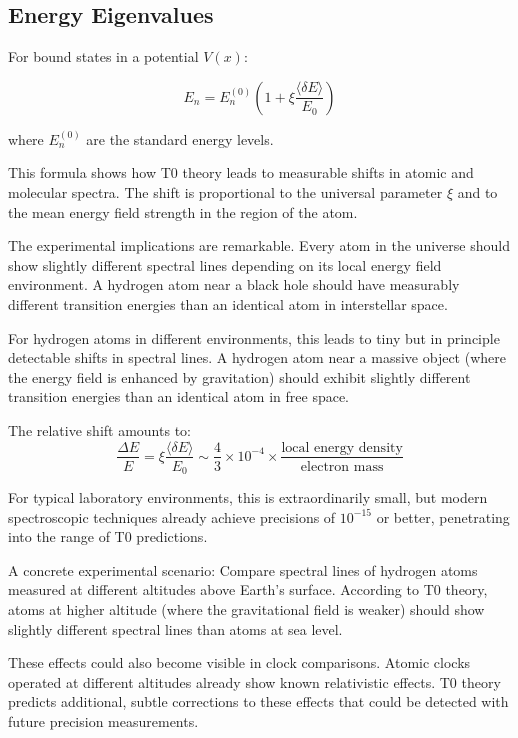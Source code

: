 \documentclass[12pt,a4paper]{article}
\newcommand{\deltaE}{\delta E}
\newcommand{\xipar}{\xi}
\theoremstyle{definition}
\theoremstyle{remark}
\begin{document}
\subsection{Energy Eigenvalues}

For bound states in a potential $V(x)$:

\begin{equation}
	E_n = E_n^{(0)} \left(1 + \xipar \frac{\langle \deltaE \rangle}{E_0}\right)
	\label{eq:energy_shift}
\end{equation}

where $E_n^{(0)}$ are the standard energy levels.

This formula shows how T0 theory leads to measurable shifts in atomic and molecular spectra. The shift is proportional to the universal parameter $\xipar$ and to the mean energy field strength in the region of the atom.

The experimental implications are remarkable. Every atom in the universe should show slightly different spectral lines depending on its local energy field environment. A hydrogen atom near a black hole should have measurably different transition energies than an identical atom in interstellar space.

For hydrogen atoms in different environments, this leads to tiny but in principle detectable shifts in spectral lines. A hydrogen atom near a massive object (where the energy field is enhanced by gravitation) should exhibit slightly different transition energies than an identical atom in free space.

The relative shift amounts to:
$$\frac{\Delta E}{E} = \xipar \frac{\langle \deltaE \rangle}{E_0} \sim \frac{4}{3} \times 10^{-4} \times \frac{\text{local energy density}}{\text{electron mass}}$$

For typical laboratory environments, this is extraordinarily small, but modern spectroscopic techniques already achieve precisions of $10^{-15}$ or better, penetrating into the range of T0 predictions.

A concrete experimental scenario: Compare spectral lines of hydrogen atoms measured at different altitudes above Earth's surface. According to T0 theory, atoms at higher altitude (where the gravitational field is weaker) should show slightly different spectral lines than atoms at sea level.

These effects could also become visible in clock comparisons. Atomic clocks operated at different altitudes already show known relativistic effects. T0 theory predicts additional, subtle corrections to these effects that could be detected with future precision measurements.
\end{document}
